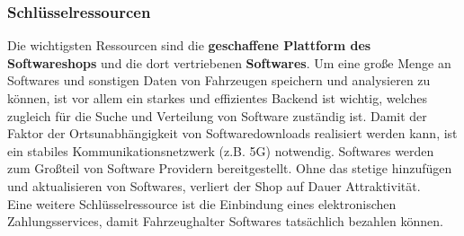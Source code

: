 \subsubsection{Schlüsselressourcen}
Die wichtigsten Ressourcen sind die \textbf{geschaffene Plattform des Softwareshops} und die dort vertriebenen \textbf{Softwares}. Um eine große Menge an Softwares und sonstigen Daten von Fahrzeugen speichern und analysieren zu können, ist vor allem ein starkes und effizientes Backend ist wichtig, welches zugleich für die Suche und Verteilung von Software zuständig ist. Damit der Faktor der Ortsunabhängigkeit von Softwaredownloads realisiert werden kann, ist ein stabiles Kommunikationsnetzwerk (z.B. 5G\cite[S. 10]{vda}) notwendig. Softwares werden zum Großteil von Software Providern bereitgestellt. Ohne das stetige hinzufügen und aktualisieren von Softwares, verliert der Shop auf Dauer Attraktivität.\\
Eine weitere Schlüsselressource ist die Einbindung eines elektronischen Zahlungsservices, damit Fahrzeughalter Softwares tatsächlich bezahlen können.\\


